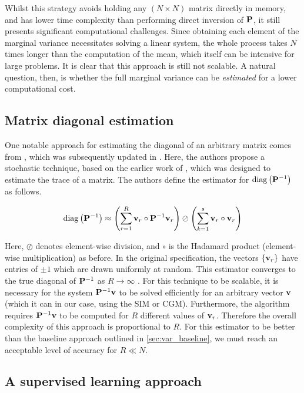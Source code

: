 Whilst this strategy avoids holding any $(N \times N)$ matrix directly in memory, and has lower time complexity than performing direct inversion of $\mathbf{P}$, it still presents significant computational challenges. Since obtaining each element of the marginal variance necessitates solving a linear system, the whole process takes $N$ times longer than the computation of the mean, which itself can be intensive for large problems. It is clear that this approach is still not scalable. A natural question, then, is whether the full marginal variance can be \textit{estimated} for a lower computational cost. 


\subsection{Matrix diagonal estimation}

\label{sec:logvar_bekas}

One notable approach for estimating the diagonal of an arbitrary matrix comes from \cite{Bekas2007}, which was subsequently updated in \cite{Tang2012}. Here, the authors propose a stochastic technique, based on the earlier work of \cite{Hutchinson1990}, which was designed to estimate the trace of a matrix. The authors define the estimator for $\text{\textup{diag}}\left(\mathbf{P}^{-1}\right)$ as follows. 
 
\begin{equation}
    \label{eq:bekas}
    \text{\textup{diag}}\left(\mathbf{P}^{-1}\right) \approx \left(\sum_{r=1}^R \mathbf{v}_r \circ \mathbf{P}^{-1} \mathbf{v}_r \right) \oslash \left(\sum_{k=1}^s \mathbf{v}_r \circ \mathbf{v}_r \right)
\end{equation}

Here, $\oslash$ denotes element-wise division, and $\circ$ is the Hadamard product (element-wise multiplication) as before. In the original specification, the vectors $\{\mathbf{v}_r\}$ have entries of $\pm 1$ which are drawn uniformly at random. This estimator converges to the true diagonal of $\mathbf{P}^{-1}$ as $R \rightarrow \infty$ \citep{Bekas2007}. For this technique to be scalable, it is necessary for the system $\mathbf{P}^{-1} \mathbf{v}$ to be solved efficiently for an arbitrary vector $\mathbf{v}$ (which it can in our case, using the SIM or CGM). Furthermore, the algorithm requires $\mathbf{P}^{-1} \mathbf{v}$ to be computed for $R$ different values of $\mathbf{v}_r$. Therefore the overall complexity of this approach is proportional to $R$. For this estimator to be better than the baseline approach outlined in \cref{sec:var_baseline}, we must reach an acceptable level of accuracy for $R \ll N$. 


\subsection{A supervised learning approach}

